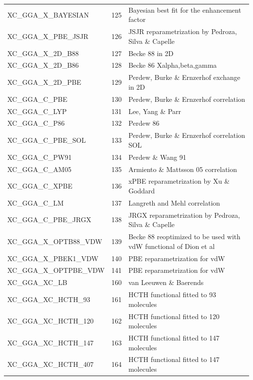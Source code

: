 \documentclass[a4paper,11pt]{report}
\begin{document}
\begin{longtable}{lrl}
   XC\_GGA\_X\_BAYESIAN       & 125  &  Bayesian best fit for the enhancement factor \\
   XC\_GGA\_X\_PBE\_JSJR      & 126  &  JSJR reparametrization by Pedroza, Silva \& Capelle \\
   XC\_GGA\_X\_2D\_B88        & 127  &  Becke 88 in 2D \\
   XC\_GGA\_X\_2D\_B86        & 128  &  Becke 86 Xalpha,beta,gamma                      \\
   XC\_GGA\_X\_2D\_PBE        & 129  &  Perdew, Burke \& Ernzerhof exchange in 2D          \\
   XC\_GGA\_C\_PBE            & 130  &  Perdew, Burke \& Ernzerhof correlation          \\
   XC\_GGA\_C\_LYP            & 131  &  Lee, Yang \& Parr \\
   XC\_GGA\_C\_P86            & 132  &  Perdew 86 \\
   XC\_GGA\_C\_PBE\_SOL       & 133  &  Perdew, Burke \& Ernzerhof correlation SOL      \\
   XC\_GGA\_C\_PW91           & 134  &  Perdew \& Wang 91 \\
   XC\_GGA\_C\_AM05           & 135  &  Armiento \& Mattsson 05 correlation             \\
   XC\_GGA\_C\_XPBE           & 136  &  xPBE reparametrization by Xu \& Goddard         \\
   XC\_GGA\_C\_LM             & 137  &  Langreth and Mehl correlation          \\
   XC\_GGA\_C\_PBE\_JRGX      & 138  &  JRGX reparametrization by Pedroza, Silva \& Capelle \\
   XC\_GGA\_X\_OPTB88\_VDW    & 139  &  Becke 88 reoptimized to be used with vdW functional of Dion et al\\
   XC\_GGA\_X\_PBEK1\_VDW     & 140  &  PBE reparametrization for vdW \\
   XC\_GGA\_X\_OPTPBE\_VDW    & 141  &  PBE reparametrization for vdW \\
   XC\_GGA\_XC\_LB            & 160  &  van Leeuwen \& Baerends \\
   XC\_GGA\_XC\_HCTH\_93      & 161  &  HCTH functional fitted to  93 molecules  \\
   XC\_GGA\_XC\_HCTH\_120     & 162  &  HCTH functional fitted to 120 molecules  \\
   XC\_GGA\_XC\_HCTH\_147     & 163  &  HCTH functional fitted to 147 molecules  \\
   XC\_GGA\_XC\_HCTH\_407     & 164  &  HCTH functional fitted to 147 molecules  \\

\end{longtable}
\end{document}
